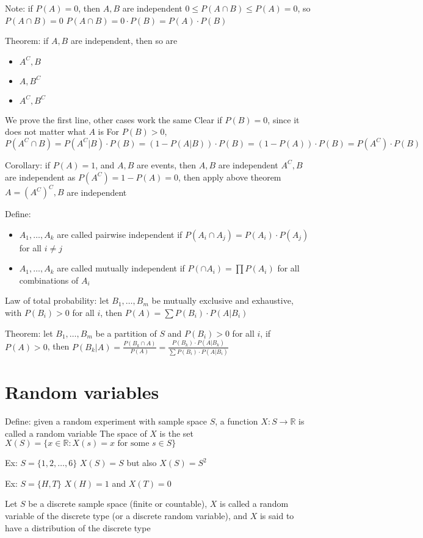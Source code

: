\documentclass{article}
\begin{document}
Note: if $P(A)=0$, then $A,B$ are independent
$0\le P(A\cap B)\le P(A)=0$, so $P(A\cap B)=0$
$P(A\cap B)=0\cdot P(B)=P(A)\cdot P(B)$

Theorem: if $A,B$ are independent, then so are
\begin{itemize}
    \item $A^C,B$
    \item $A,B^C$
    \item $A^C,B^C$
\end{itemize}

We prove the first line, other cases work the same
Clear if $P(B)=0$, since it does not matter what $A$ is
For $P(B)>0$, $P(A^C\cap B)=P(A^C\vert B)\cdot P(B)=(1-P(A\vert B))\cdot P(B)=(1-P(A))\cdot P(B)=P(A^C)\cdot P(B)$

Corollary: if $P(A)=1$, and $A,B$ are events, then $A,B$ are independent
$A^C,B$ are independent as $P(A^C)=1-P(A)=0$, then apply above theorem
$A=(A^C)^C,B$ are independent

Define:
\begin{itemize}
    \item $A_1,\dots,A_k$ are called pairwise independent if $P(A_i\cap A_j)=P(A_i)\cdot P(A_j)$ for all $i\neq j$
    \item $A_1,\dots,A_k$ are called mutually independent if $P(\cap A_i)=\prod P(A_i)$ for all combinations of $A_i$
\end{itemize}

Law of total probability: let $B_1,\dots,B_m$ be mutually exclusive and exhaustive, with $P(B_i)>0$ for all $i$, then $P(A)=\sum P(B_i)\cdot P(A\vert B_i)$

Theorem: let $B_1,\dots,B_m$ be a partition of $S$ and $P(B_i)>0$ for all $i$, if $P(A)>0$, then $P(B_k\vert A)=\frac{P(B_k\cap A)}{P(A)}=\frac{P(B_k)\cdot P(A\vert B_k)}{\sum P(B_i)\cdot P(A\vert B_i)}$

\section{Random variables}

Define: given a random experiment with sample space $S$, a function $X:S\to\mathbb{R}$ is called a random variable
The space of $X$ is the set $X(S)=\{x\in\mathbb{R}:X(s)=x\text{ for some }s\in S\}$

Ex: $S=\{1,2,\dots,6\}$
$X(S)=S$ but also $X(S)=S^2$

Ex: $S=\{H,T\}$
$X(H)=1$ and $X(T)=0$

Let $S$ be a discrete sample space (finite or countable), $X$ is called a random variable of the discrete type (or a discrete random variable), and $X$ is said to have a distribution of the discrete type
\end{document}
